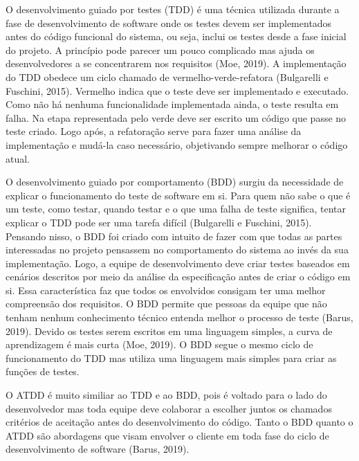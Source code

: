 \documentclass{article}
\begin{document}
    O desenvolvimento guiado por testes (TDD) é uma técnica utilizada durante a fase de desenvolvimento de software onde os testes devem ser implementados
antes do código funcional do sistema, ou seja, inclui os testes desde a fase inicial do projeto. A princípio pode parecer um pouco complicado mas ajuda
os desenvolvedores a se concentrarem nos requisitos (Moe, 2019). A implementação do TDD obedece um ciclo chamado de vermelho-verde-refatora (Bulgarelli
e Fuschini, 2015). Vermelho indica que o teste deve ser implementado e executado. Como não há nenhuma funcionalidade implementada ainda, o teste resulta
em falha. Na etapa representada pelo verde deve ser escrito um código que passe no teste criado. Logo após, a refatoração serve para fazer uma análise
da implementação e mudá-la caso necessário, objetivando sempre melhorar o código atual.

    O desenvolvimento guiado por comportamento (BDD) surgiu da necessidade de explicar o funcionamento do teste de software em si. Para quem não sabe o que
é um teste, como testar, quando testar e o que uma falha de teste significa, tentar explicar o TDD pode ser uma tarefa difícil (Bulgarelli e Fuschini,
2015). Pensando nisso, o BDD foi criado com intuito de fazer com que  todas as partes interessadas no projeto pensassem no comportamento do sistema ao
invés da sua implementação. Logo, a equipe de desenvolvimento deve criar testes baseados em cenários descritos por meio da análise da especificação
antes de criar o código em si. Essa característica faz que todos os envolvidos consigam ter uma melhor compreensão dos requisitos. O BDD permite que
pessoas da equipe que não tenham nenhum conhecimento técnico entenda melhor o processo de teste (Barus, 2019). Devido os testes serem escritos em uma
linguagem simples, a curva de aprendizagem é mais curta (Moe, 2019). O BDD segue o mesmo ciclo de funcionamento do TDD mas utiliza uma linguagem mais
simples para criar as funções de testes.

    O ATDD é muito similiar ao TDD e ao BDD, pois é voltado para o lado do desenvolvedor mas toda equipe deve colaborar a escolher juntos os chamados
critérios de aceitação antes do desenvolvimento do código. Tanto o BDD quanto o ATDD são abordagens que visam envolver o cliente em toda fase do ciclo
de desenvolvimento de software (Barus, 2019).
\end{document}
